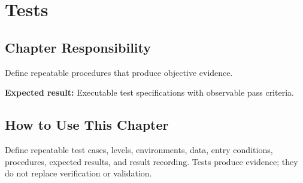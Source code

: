 \chapter{Tests}
\section{Chapter Responsibility}
\label{Section:TestsResponsibility}
Define repeatable procedures that produce objective evidence.

\noindent\textbf{Expected result:} Executable test specifications with observable pass criteria.

\section{How to Use This Chapter}
Define repeatable test cases, levels, environments, data, entry conditions, procedures, expected results, and result recording. Tests produce evidence; they do not replace verification or validation.
